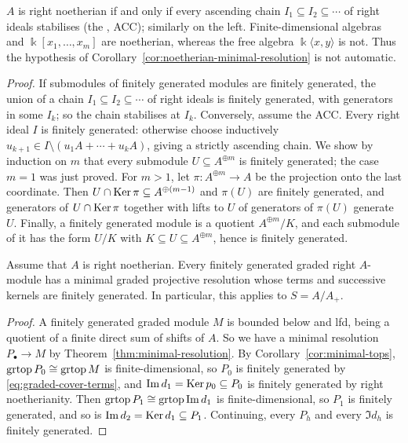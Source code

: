\begin{supplementary}
\begin{remark}\label{rem:noetherian-acc}
$A$ is right noetherian if and only if every ascending chain $I_1\subseteq I_2\subseteq\cdots$ of right ideals stabilises (the , ACC); similarly on the left.
Finite-dimensional algebras and $\Bbbk[x_1,\ldots,x_m]$ are noetherian, whereas the free algebra $\Bbbk\langle x,y\rangle$ is not.
Thus the hypothesis of Corollary~\ref{cor:noetherian-minimal-resolution} is not automatic.

\emph{Proof.}
If submodules of finitely generated modules are finitely generated, the union of a chain $I_1\subseteq I_2\subseteq\cdots$ of right ideals is finitely generated, with generators in some $I_k$; so the chain stabilises at $I_k$.
Conversely, assume the ACC.
Every right ideal $I$ is finitely generated: otherwise choose inductively $u_{k+1}\in I\setminus(u_1A+\cdots+u_kA)$, giving a strictly ascending chain.
We show by induction on $m$ that every submodule $U\subseteq A^{\oplus m}$ is finitely generated; the case $m=1$ was just proved.
For $m>1$, let $\pi:A^{\oplus m}\to A$ be the projection onto the last coordinate.
Then $U\cap\operatorname{Ker}\nolimits\pi\subseteq A^{\oplus(m-1)}$ and $\pi(U)$ are finitely generated, and generators of $U\cap\operatorname{Ker}\nolimits\pi$ together with lifts to $U$ of generators of $\pi(U)$ generate $U$.
Finally, a finitely generated module is a quotient $A^{\oplus m}/K$, and each submodule of it has the form $U/K$ with $K\subseteq U\subseteq A^{\oplus m}$, hence is finitely generated.
\end{remark}
\end{supplementary}

\begin{corollary}\label{cor:noetherian-minimal-resolution}
Assume that $A$ is right noetherian.
Every finitely generated graded right $A$-module has a minimal graded projective resolution whose terms and successive kernels are finitely generated.
In particular, this applies to $S=A/A_+$.
\end{corollary}

\begin{proof}
A finitely generated graded module $M$ is bounded below and lfd, being a quotient of a finite direct sum of shifts of $A$.
So we have a minimal resolution $P_\bullet\to M$ by Theorem~\ref{thm:minimal-resolution}.
By Corollary~\ref{cor:minimal-tops}, $\operatorname{grtop}\nolimits P_0\cong\operatorname{grtop}\nolimits M$ is finite-dimensional, so $P_0$ is finitely generated by \eqref{eq:graded-cover-terms}, and $\operatorname{Im}\nolimits d_1=\operatorname{Ker}\nolimits p_0\subseteq P_0$ is finitely generated by right noetherianity.
Then $\operatorname{grtop}\nolimits P_1\cong\operatorname{grtop}\nolimits\operatorname{Im}\nolimits d_1$ is finite-dimensional, so $P_1$ is finitely generated, and so is $\operatorname{Im}\nolimits d_2=\operatorname{Ker}\nolimits d_1\subseteq P_1$.
Continuing, every $P_h$ and every $\Im d_h$ is finitely generated.
\end{proof}

